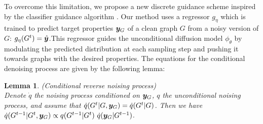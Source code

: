 \documentclass{article} %
\theoremstyle{plain}
\newtheorem{lemma}[theorem]{Lemma}
\theoremstyle{definition}
\theoremstyle{remark}
\begin{document}
To overcome this limitation, we propose a new discrete guidance scheme inspired by the classifier guidance algorithm \citep{sohldickstein2015diffusion}. 
Our method uses a regressor $g_\eta$ which is trained to predict target properties ${\bm{y}}_G$ of a clean graph $G$ from a noisy version of $G$: $g_\eta(G^t) = \hat {{\bm{y}}}$.This regressor guides the unconditional diffusion model $\phi_\theta$ by modulating the predicted distribution at each sampling step and pushing it towards graphs with the desired properties. The equations for the conditional denoising process are given by the following lemma:

\begin{lemma} (Conditional reverse noising process) \citep{dhariwal2021diffusion} \\
Denote $\dot q$ the noising process conditioned on ${\bm{y}}_G$, $q$ the unconditional noising process, and assume that $\dot q(G^t | G, {\bm{y}}_G) = \dot q(G^t | G)$. Then we have $\dot q(G^{t-1} | G^t, {\bm{y}}_G) \propto q(G^{t-1} | G^t) ~ \dot q({\bm{y}}_G|G^{t-1})$.
\end{lemma}
\end{document}
